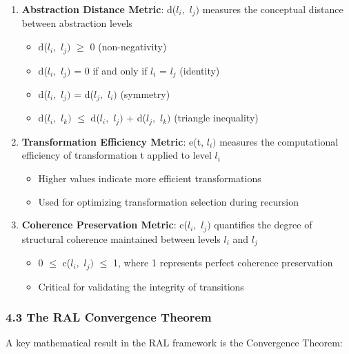 \documentclass[
]{article}
\providecommand{\tightlist}{%
  \setlength{\itemsep}{0pt}\setlength{\parskip}{0pt}}
\begin{document}
\begin{enumerate}
\def\labelenumi{\arabic{enumi}.}
\tightlist
\item
  \textbf{Abstraction Distance Metric}: d(\(l_{i},\) \(l_{j})\) measures
  the conceptual distance between abstraction levels

  \begin{itemize}
  \tightlist
  \item
    d(\(l_{i},\) \(l_{j})\) \(\geq \) 0 (non-negativity)
  \item
    d(\(l_{i},\) \(l_{j})\) = 0 if and only if \(l_{i}\) = \(l_{j}\)
    (identity)
  \item
    d(\(l_{i},\) \(l_{j})\) = d(\(l_{j},\) \(l_{i})\) (symmetry)
  \item
    d(\(l_{i},\) \(l_{k})\) \(\leq \) d(\(l_{i},\) \(l_{j})\) +
    d(\(l_{j},\) \(l_{k})\) (triangle inequality)
  \end{itemize}
\item
  \textbf{Transformation Efficiency Metric}: e(t, \(l_{i})\) measures
  the computational efficiency of transformation t applied to level
  \(l_{i}\)

  \begin{itemize}
  \tightlist
  \item
    Higher values indicate more efficient transformations
  \item
    Used for optimizing transformation selection during recursion
  \end{itemize}
\item
  \textbf{Coherence Preservation Metric}: c(\(l_{i},\) \(l_{j})\)
  quantifies the degree of structural coherence maintained between
  levels \(l_{i}\) and \(l_{j}\)

  \begin{itemize}
  \tightlist
  \item
    0 \(\leq \) c(\(l_{i},\) \(l_{j})\) \(\leq \) 1, where 1 represents
    perfect coherence preservation
  \item
    Critical for validating the integrity of transitions
  \end{itemize}
\end{enumerate}

\subsubsection{4.3 The RAL Convergence
Theorem}\label{the-ral-convergence-theorem}

A key mathematical result in the RAL framework is the Convergence
Theorem:
\end{document}
